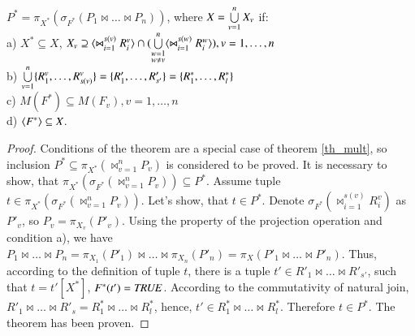\begin{theorem}
$P^{\ast} =  \pi_{X^{\ast}} ( \sigma_{F^{\ast}} (P_1 \Join \dots \Join
P_n))$, where $X = \bigcup\limits_{v=1}^{n} X_{v}$ if:
\\a) $X^{\ast} \subseteq X$, $X_v \supseteq \<\Join_{i=1}^{s(v)} R^v_i> \cap (\bigcup\limits_{\substack{w=1\\ w \neq v}}^{n} \<\Join_{i=1}^{s(w)} R^w_i> ), v = 1,\dots,n$
\\b)
$ \bigcup\limits_{v=1}^{n} \{R^{v}_{1}, \ldots, R^{v}_{s(v)}\} = \{R'_{1}, \ldots, R'_{s'}\}
= \{R^{\ast}_{1}, \ldots, R^{\ast}_{l}\} $
\\c) $M(F^{\ast}) \subseteq M(F_{v}), v = 1,\dots,n $
\\d) $ \<F^{\ast}> \subseteq X $.
\label{th_mult_eq}
\end{theorem} 
\begin{proof}
Conditions of the theorem are a special case of theorem \ref{th_mult}, so
inclusion  $P^{\ast} \subseteq \pi_{X^{\ast}} (\Join_{v=1}^{n} P_{v})$ is
considered to be proved. It is necessary to show, that $\pi_{X^{\ast}}
(\sigma_{F^{\ast}} (\Join_{v=1}^{n} P_{v})) \subseteq P^{\ast}$. Assume tuple
$t \in \pi_{X^{\ast}} (\sigma_{F^{\ast}} (\Join_{v=1}^{n} P_{v}))$. Let's show,
that $t \in P^{\ast}$. Denote $\sigma_{F^{\ast}} (\Join_{i=1}^{s(v)} R^{v}_i)$
as $P'_v$, so $P_v = \pi_{X_v} (P'_v)$. Using the property of the projection
operation and condition a), we have $P_1 \Join \dots \Join P_n = \pi_{X_1}
(P'_1) \Join \dots \Join \pi_{X_n} (P'_n) = \pi_{X} (P'_1 \Join \dots \Join
P'_{n})$. Thus, according to the definition of tuple $t$, there is a tuple  $t' \in R'_1
\Join \ldots \Join R'_{s'}$, such that $t = t'[X^{\ast}]$, $F^{\ast} (t')=\mathit{TRUE}$.
According to the commutativity of natural join, $R'_1 \Join \ldots \Join
R'_s = R^{\ast}_1 \Join \ldots \Join R^{\ast}_l$, hence, $t' \in R^{\ast}_1 \Join
\ldots \Join R^{\ast}_l$. Therefore $t \in P^{\ast}$. The theorem has been proven.
\end{proof} 
